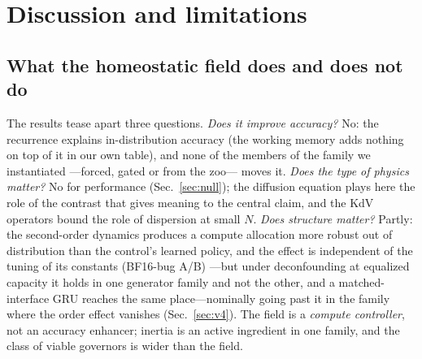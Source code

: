 \documentclass{article}
\begin{document}
\section{Discussion and limitations}

\subsection{What the homeostatic field does and does not do}
The results tease apart three questions. \emph{Does it improve accuracy?} No: the
recurrence explains in-distribution accuracy (the working memory adds nothing
on top of it in our own table), and none of the members of the family we
instantiated ---forced, gated or from the zoo--- moves it. \emph{Does the type of
physics matter?} No for performance (Sec.~\ref{sec:null}); the diffusion equation
plays here the role of the contrast that gives meaning to the central claim, and
the KdV operators bound the role of dispersion at small $N$. \emph{Does structure
matter?} Partly: the second-order dynamics produces a compute allocation more
robust out of distribution than the control's learned policy, and the effect is
independent of the tuning of its constants (BF16-bug A/B) ---but under
deconfounding at equalized capacity it holds in one generator family and not the
other, and a matched-interface GRU reaches the same place---nominally going
past it in the family where the order effect vanishes (Sec.~\ref{sec:v4}).
The field is a \emph{compute controller}, not an accuracy enhancer; inertia is an
active ingredient in one family, and the class of viable governors is wider than
the field.
\end{document}
